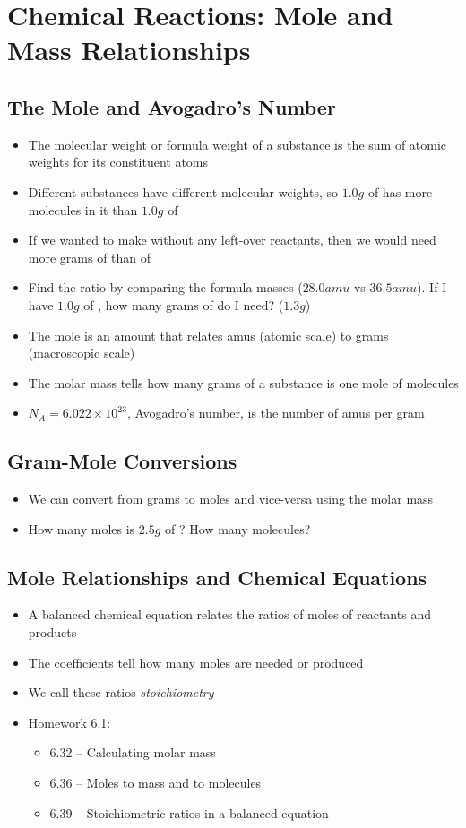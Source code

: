 \documentclass[12pt, openany, letterpaper]{memoir}
\begin{document}
\chapter{Chemical Reactions: Mole and Mass Relationships}
\section{The Mole and Avogadro's Number}
\begin{itemize}
	\item The molecular weight or formula weight of a substance is the sum of atomic weights for its constituent atoms
	\item Different substances have different molecular weights, so $1.0g$ of  has more molecules in it than $1.0g$ of 
	\item If we wanted to make  without any left-over reactants, then we would need more grams of  than of 
	\item Find the ratio by comparing the formula masses ($28.0amu$ vs $36.5amu$). If I have $1.0g$ of , how many grams of  do I need? ($1.3g$)
	\item The mole is an amount that relates amus (atomic scale) to grams (macroscopic scale)
	\item The molar mass tells how many grams of a substance is one mole of molecules
	\item $N_A=6.022\times10^{23}$, Avogadro's number, is the number of amus per gram
\end{itemize}
\section{Gram-Mole Conversions}
\begin{itemize}
	\item We can convert from grams to moles and vice-versa using the molar mass
	\item How many moles is $2.5g$ of ? How many molecules?
\end{itemize}

\section{Mole Relationships and Chemical Equations}
\begin{itemize}
	\item A balanced chemical equation relates the ratios of moles of reactants and products
	\item The coefficients tell how many moles are needed or produced
	\item We call these ratios \emph{stoichiometry}
	\item Homework 6.1:
	\begin{itemize}	
		\item 6.32 -- Calculating molar mass
		\item 6.36 -- Moles to mass and to molecules
		\item 6.39 -- Stoichiometric ratios in a balanced equation
	\end{itemize} 
\end{itemize}
\end{document}
